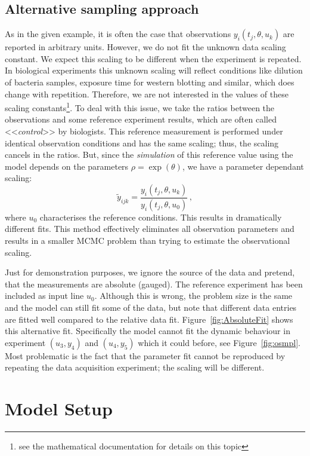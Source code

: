 \documentclass[english]{scrartcl}
\begin{document}
\subsection{Alternative sampling approach}

As in the given example, it is often the case that observations
$y_i(t_j,\theta,u_k)$ are reported in arbitrary units. However, we do
not fit the unknown data scaling constant. We expect this scaling to
be different when the experiment is repeated. In biological
experiments this unknown scaling will reflect conditions like dilution
of bacteria samples, exposure time for western blotting and similar,
which does change with repetition. Therefore, we are not interested in
the values of these scaling constants\footnote{see the mathematical
  documentation for details on this topic}. To deal with this issue,
we take the ratios between the observations and some reference
experiment results, which are often called <<\emph{control}>> by
biologists. This reference measurement is performed under identical
observation conditions and has the same scaling; thus, the scaling
cancels in the ratios. But, since the \emph{simulation} of this
reference value using the model depends on the parameters
$\rho=\exp(\theta)$, we have a parameter dependant scaling:
\begin{equation}
  \tilde y_{ijk}=\frac{y_i(t_j,\theta,u_k)}{y_i(t_j,\theta,u_0)}\,,
\end{equation}
where $u_0$ characterises the reference conditions. This results in
dramatically different fits. This method effectively eliminates all
observation parameters and results in a smaller MCMC problem than
trying to estimate the observational scaling.

Just for demonstration purposes, we ignore the source of the data and
pretend, that the measurements are absolute (gauged). The reference
experiment has been included as input line $u_0$. Although this is
wrong, the problem size is the same and the model can still fit some
of the data, but note that different data entries are fitted well
compared to the relative data fit. Figure~\ref{fig:AbsoluteFit} shows
this alternative fit. Specifically the model cannot fit the dynamic
behaviour in experiment $(u_3,y_4)$ and $(u_4,y_5)$ which it could
before, see Figure~\ref{fig:osmpl}. Most problematic is the fact that
the parameter fit cannot be reproduced by repeating the data
acquisition experiment; the scaling will be different.

\printbibliography

\appendix
\section{Model Setup}
\label{sec:model}

\end{document}
